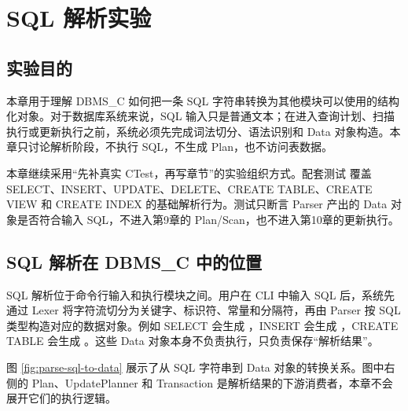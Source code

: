 \chapter{SQL 解析实验}
\label{chap:parse}

\section{实验目的}
\label{sec:parse-purpose}

本章用于理解 DBMS\_C 如何把一条 SQL 字符串转换为其他模块可以使用的结构化对象。对于数据库系统来说，SQL 输入只是普通文本；在进入查询计划、扫描执行或更新执行之前，系统必须先完成词法切分、语法识别和 Data 对象构造。本章只讨论解析阶段，不执行 SQL，不生成 Plan，也不访问表数据。

本章继续采用“先补真实 CTest，再写章节”的实验组织方式。配套测试  覆盖 SELECT、INSERT、UPDATE、DELETE、CREATE TABLE、CREATE VIEW 和 CREATE INDEX 的基础解析行为。测试只断言 Parser 产出的 Data 对象是否符合输入 SQL，不进入第9章的 Plan/Scan，也不进入第10章的更新执行。

\section{SQL 解析在 DBMS\_C 中的位置}
\label{sec:parse-position}

SQL 解析位于命令行输入和执行模块之间。用户在 CLI 中输入 SQL 后，系统先通过 Lexer 将字符流切分为关键字、标识符、常量和分隔符，再由 Parser 按 SQL 类型构造对应的数据对象。例如 SELECT 会生成 ，INSERT 会生成 ，CREATE TABLE 会生成 。这些 Data 对象本身不负责执行，只负责保存“解析结果”。

图 \ref{fig:parse-sql-to-data} 展示了从 SQL 字符串到 Data 对象的转换关系。图中右侧的 Plan、UpdatePlanner 和 Transaction 是解析结果的下游消费者，本章不会展开它们的执行逻辑。

